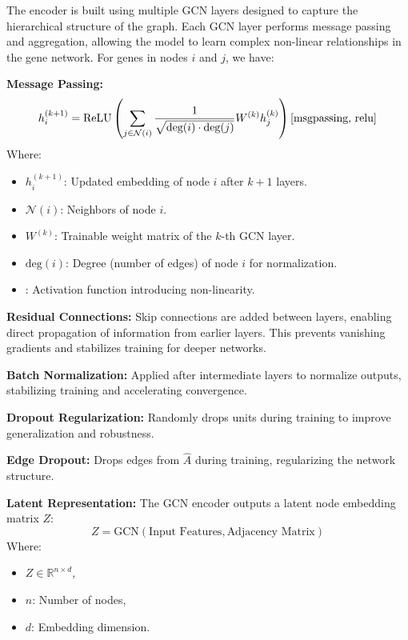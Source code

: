 \documentclass{article}
\newcounter{subsubsubsection}[subsubsection]
\begin{document}

The encoder is built using multiple GCN layers designed to capture the hierarchical structure of the graph. Each GCN layer performs message passing and aggregation, allowing the model to learn complex non-linear relationships in the gene network. For genes in nodes \(i\) and \(j\), we have:

\textbf{Message Passing:}
\[
h_i^{(k+1)} = \text{ReLU} \left( \sum_{j \in \mathcal{N}(i)} \frac{1}{\sqrt{\text{deg}(i)\cdot \text{deg}(j)}} W^{(k)} h_j^{(k)} \right) \cite{msgpassing, relu}
\]
Where:
\begin{itemize}
    \item \(h_i^{(k+1)}\): Updated embedding of node \(i\) after \(k+1\) layers.
    \item \(\mathcal{N}(i)\): Neighbors of node \(i\).
    \item \(W^{(k)}\): Trainable weight matrix of the \(k\)-th GCN layer.
    \item \(\text{deg}(i)\): Degree (number of edges) of node \(i\) for normalization.
    \item {}: Activation function introducing non-linearity.
\end{itemize}

\textbf{Residual Connections:}  
Skip connections are added between layers, enabling direct propagation of information from earlier layers. This prevents vanishing gradients and stabilizes training for deeper networks.

\textbf{Batch Normalization:}  
Applied after intermediate layers to normalize outputs, stabilizing training and accelerating convergence.

\textbf{Dropout Regularization:}  
Randomly drops units during training to improve generalization and robustness.

\textbf{Edge Dropout:}  
Drops edges from \(\hat{A}\) during training, regularizing the network structure.

\textbf{Latent Representation:}  
The GCN encoder outputs a latent node embedding matrix \(Z\):
\[
Z = \text{GCN}(\text{Input Features}, \text{Adjacency Matrix})
\]
Where:
\begin{itemize}
    \item \(Z \in \mathbb{R}^{n \times d}\),
    \item \(n\): Number of nodes,
    \item \(d\): Embedding dimension.
\end{itemize}
\end{document}
